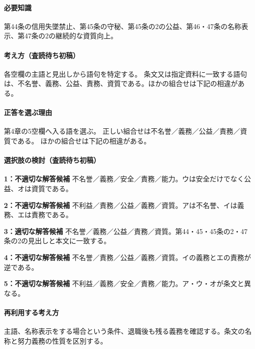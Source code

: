 \paragraph{必要知識} 第44条の信用失墜禁止、第45条の守秘、第45条の2の公益、第46・47条の名称表示、第47条の2の継続的な資質向上。

\paragraph{考え方（査読待ち初稿）} 各空欄の主語と見出しから語句を特定する。 条文又は指定資料に一致する語句は、不名誉、義務、公益、責務、資質である。ほかの組合せは下記の相違がある。

\paragraph{正答を選ぶ理由} 第4章の5空欄へ入る語を選ぶ。 正しい組合せは不名誉／義務／公益／責務／資質である。 ほかの組合せは下記の相違がある。

\paragraph{選択肢の検討（査読待ち初稿）}\mbox{}\par

\noindent\textbf{1：不適切な解答候補} 不名誉／義務／安全／責務／能力。ウは安全だけでなく公益、オは資質である。\par

\noindent\textbf{2：不適切な解答候補} 不利益／責務／公益／義務／資質。アは不名誉、イは義務、エは責務である。\par

\noindent\textbf{3：適切な解答候補} 不名誉／義務／公益／責務／資質。第44・45・45条の2・47条の2の見出しと本文に一致する。\par

\noindent\textbf{4：不適切な解答候補} 不名誉／責務／公益／義務／資質。イの義務とエの責務が逆である。\par

\noindent\textbf{5：不適切な解答候補} 不利益／義務／安全／責務／能力。ア・ウ・オが条文と異なる。\par

\paragraph{再利用する考え方} 主語、名称表示をする場合という条件、退職後も残る義務を確認する。条文の名称と努力義務の性質を区別する。


